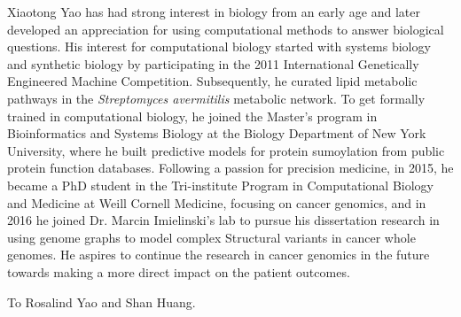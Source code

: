 \documentclass[phd,tocprelim]{cornell}
\begin{document}
\begin{biosketch}
    Xiaotong Yao has had strong interest in biology from an early age and later developed an appreciation for using computational methods to answer biological questions. His interest for computational biology started with systems biology and synthetic biology by participating in the 2011 International Genetically Engineered Machine Competition. Subsequently, he curated lipid metabolic pathways in the \textit{Streptomyces avermitilis} metabolic network. To get formally trained in computational biology, he joined the Master's program in Bioinformatics and Systems Biology at the Biology Department of New York University, where he built predictive models for protein sumoylation from public protein function databases. Following a passion for precision medicine, in 2015, he became a PhD student in the Tri-institute Program in Computational Biology and Medicine at Weill Cornell Medicine, focusing on cancer genomics, and in 2016 he joined Dr. Marcin Imielinski's lab to pursue his dissertation research in using genome graphs to model complex Structural variants in cancer whole genomes. He aspires to continue the research in cancer genomics in the future towards making a more direct impact on the patient outcomes.
\end{biosketch}

\begin{dedication}
    To Rosalind Yao and Shan Huang.
\end{dedication}
\end{document}
